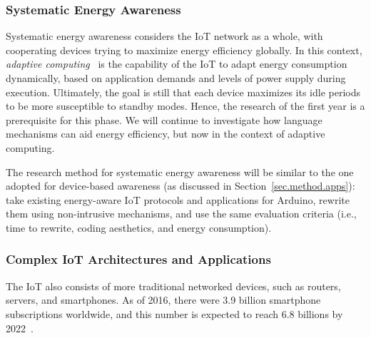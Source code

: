 \documentclass[12pt,english]{amsart}
\begin{document}
\subsubsection{Systematic Energy Awareness}
\label{sec.method.systematic}

Systematic energy awareness
considers the IoT network as a whole, with cooperating devices trying to
maximize energy efficiency globally.
%
In this context, \emph{adaptive computing}~\cite{adaptive} is the capability of
the IoT to adapt energy consumption dynamically, based on application demands
and levels of power supply during execution.
%
Ultimately, the goal is still that each device maximizes its idle
periods to be more susceptible to standby modes.
Hence, the research of the
first year is a prerequisite for this phase.
%
We will continue to investigate how language mechanisms can aid energy
efficiency, but now in the context of adaptive computing.

The research method for systematic energy awareness will be similar to the
one adopted for device-based awareness (as discussed in
Section~\ref{sec.method.apps}):
take existing energy-aware IoT protocols and applications for Arduino, rewrite
them using non-intrusive mechanisms, and use the same evaluation criteria
(i.e., time to rewrite, coding aesthetics, and energy consumption).

\subsubsection{Complex IoT Architectures and Applications}
\label{sec.method.complex}

%
The IoT also consists of more traditional networked devices, such as
routers, servers, and smartphones.
%
As of 2016, there were 3.9 billion smartphone subscriptions worldwide, and
this number is expected to reach 6.8 billions by 2022~\cite{ericsson.mobility}.
\end{document}
